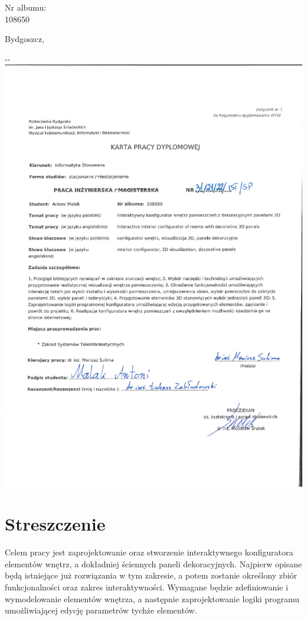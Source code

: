 \documentclass{article} %
\begin{document}
\begin{minipage}{2in}
Nr albumu: \\
108650
\end{minipage}

\begin{center}
 Bydgoszcz,
\end{center}

\pagestyle{fancy}

\begin{adjustwidth}{-\oddsidemargin-1in}{-\rightmargin}
\centering
\includegraphics[width=\paperwidth,angle=0.3]{Załączniki/karta_pracy_skan.png}
\end{adjustwidth}
\newpage


\section*{Streszczenie}
Celem pracy jest zaprojektowanie oraz stworzenie interaktywnego konfiguratora elementów wnętrz, a dokładniej ściennych paneli dekoracyjnych. Najpierw opisane będą istniejące już rozwiązania w tym zakresie, a potem zostanie określony zbiór funkcjonalności oraz zakres interaktywności. Wymagane będzie zdefiniowanie i wymodelowanie elementów wnętrza, a następnie zaprojektowanie logiki programu umożliwiającej edycję parametrów tychże elementów.
\\
\end{document}
